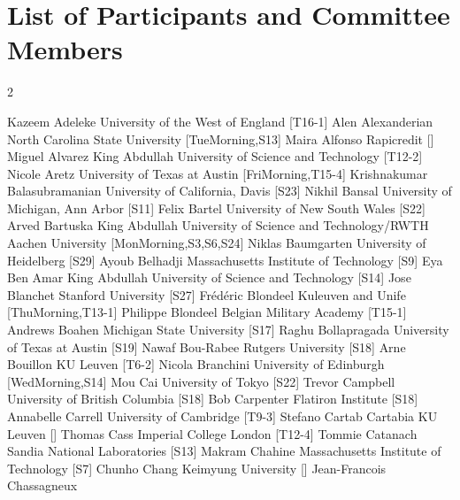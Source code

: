 \chapter{List of Participants and Committee Members}
\setlength{\columnsep}{1cm}
\begin{multicols}{2}
\small\raggedright
\participantne
  {Kazeem Adeleke}
  {University of the West of England}
  [T16-1]
\participantne
  {Alen Alexanderian}
  {North Carolina State University}
  [TueMorning,S13]
\participantne
  {Maira Alfonso}
  {Rapicredit}
  []
\participantne
  {Miguel Alvarez}
  {King Abdullah University of Science and Technology}
  [T12-2]
\participantne
  {Nicole Aretz}
  {University of Texas at Austin}
  [FriMorning,T15-4]
\participantne
  {Krishnakumar Balasubramanian}
  {University of California, Davis}
  [S23]
\participantne
  {Nikhil Bansal}
  {University of Michigan, Ann Arbor}
  [S11]
\participantne
  {Felix Bartel}
  {University of New South Wales}
  [S22]
\participantne
  {Arved Bartuska}
  {King Abdullah University of Science and Technology/RWTH Aachen University}
  [MonMorning,S3,S6,S24]
\participantne
  {Niklas Baumgarten}
  {University of Heidelberg}
  [S29]
\participantne
  {Ayoub Belhadji}
  {Massachusetts Institute of Technology}
  [S9]
\participantne
  {Eya Ben Amar}
  {King Abdullah University of Science and Technology}
  [S14]
\participantne
  {Jose Blanchet}
  {Stanford University}
  [S27]
\participantne
  {Fr\'ed\'eric Blondeel}
  {Kuleuven and Unife}
  [ThuMorning,T13-1]
\participantne
  {Philippe Blondeel}
  {Belgian Military Academy}
  [T15-1]
\participantne
  {Andrews Boahen}
  {Michigan State University}
  [S17]
\participantne
  {Raghu Bollapragada}
  {University of Texas at Austin}
  [S19]
\participantne
  {Nawaf Bou-Rabee}
  {Rutgers University}
  [S18]
\participantne
  {Arne Bouillon}
  {KU Leuven}
  [T6-2]
\participantne
  {Nicola Branchini}
  {University of Edinburgh}
  [WedMorning,S14]
\participantne
  {Mou Cai}
  {University of Tokyo}
  [S22]
\participantne
  {Trevor Campbell}
  {University of British Columbia}
  [S18]
\participantne
  {Bob Carpenter}
  {Flatiron Institute}
  [S18]
\participantne
  {Annabelle Carrell}
  {University of Cambridge}
  [T9-3]
\participantne
  {Stefano Cartab Cartabia}
  {KU Leuven}
  []
\participantne
  {Thomas Cass}
  {Imperial College London}
  [T12-4]
\participantne
  {Tommie Catanach}
  {Sandia National Laboratories}
  [S13]
\participantne
  {Makram Chahine}
  {Massachusetts Institute of Technology}
  [S7]
\participantne
  {Chunho Chang}
  {Keimyung University}
  []
\participantne
  {Jean-Francois Chassagneux}

\end{multicols}

